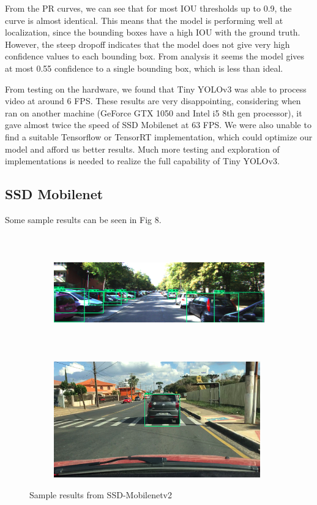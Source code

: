 \documentclass[12pt,letterpaper]{article}
\begin{document}
From the PR curves, we can see that for most IOU thresholds up to 0.9, the curve is almost identical. This means that the model is performing well at localization, since the bounding boxes have a high IOU with the ground truth. However, the steep dropoff indicates that the model does not give very high confidence values to each bounding box. From analysis it seems the model gives at most 0.55 confidence to a single bounding box, which is less than ideal. 

From testing on the hardware, we found that Tiny YOLOv3 was able to process video at around 6 FPS. These results are very disappointing, considering when ran on another machine (GeForce GTX 1050 and Intel i5 8th gen processor), it gave almost twice the speed of SSD Mobilenet at 63 FPS. We were also unable to find a suitable Tensorflow or TensorRT implementation, which could optimize our model and afford us better results. Much more testing and exploration of implementations is needed to realize the full capability of Tiny YOLOv3.

\subsection{SSD Mobilenet}

Some sample results can be seen in Fig 8.

\begin{figure}[h]
    \centering
    \begin{subfigure}{0.45\textwidth}
        \includegraphics[width = 0.9\linewidth,height=5cm]{assets/SSD_fig1.png}
        \caption{}
    \end{subfigure}
    \begin{subfigure}{0.45\textwidth}
        \includegraphics[width=0.9\linewidth,height=5cm]{assets/SSD_fig2.png}
        \caption{}
    \end{subfigure}
    \caption{Sample results from SSD-Mobilenetv2}
\end{figure}
\end{document}
